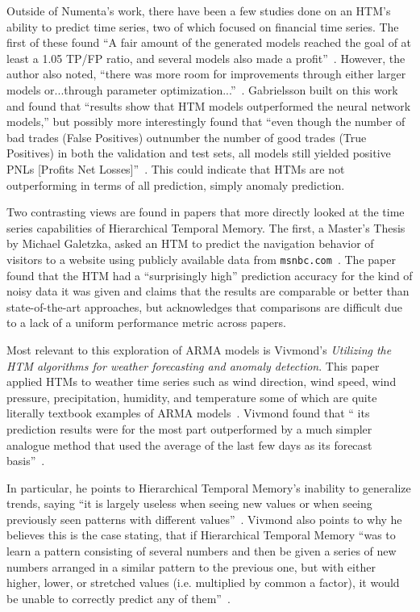 \documentclass[oneside,12pt,openany]{book}
\begin{document}
	Outside of Numenta's work, there have been a few studies done on an HTM's ability to predict time series, two of which focused on financial time series. The first of these found ``A fair amount of the generated models reached the goal of at least a 1.05 TP/FP ratio, and several models also made a profit''~\cite{Evaluation}. However, the author also noted, ``there was more room for improvements through either larger models or...through parameter optimization...''~\cite{Evaluation}. Gabrielsson built on this work and found that ``results show that HTM models outperformed the neural network models,'' but possibly more interestingly found that ``even though the number of bad trades (False Positives) outnumber the number of good trades (True Positives) in both the validation and test sets, all models still yielded positive PNLs [Profits Net Losses]''~\cite{EvolvingTrading}. This could indicate that HTMs are not outperforming in terms of all prediction, simply anomaly prediction.
	
	Two contrasting views are found in papers that more directly looked at the time series capabilities of Hierarchical Temporal Memory. The first, a Master's Thesis by Michael Galetzka, asked an HTM to predict the navigation behavior of visitors to a website using publicly available data from \texttt{msnbc.com}~\cite{Galetzka}. The paper found that the HTM had a ``surprisingly high'' prediction accuracy for the kind of noisy data it was given and claims that the results are comparable or better than state-of-the-art approaches, but acknowledges that comparisons are difficult due to a lack of a uniform performance metric across papers.
	
	Most relevant to this exploration of ARMA models is Vivmond's \textit{Utilizing the HTM algorithms for weather forecasting and anomaly detection}. This paper applied HTMs to weather time series such as wind direction, wind speed, wind pressure, precipitation, humidity, and temperature some of which are quite literally textbook examples of ARMA models~\cite{Box,WeatherForecast}. Vivmond found that `` its prediction results were for the most part outperformed by a much simpler analogue method that used the average of the last few days as its forecast basis''~\cite{WeatherForecast}. 
	
	In particular, he points to Hierarchical Temporal Memory's inability to generalize trends, saying ``it is largely useless when seeing new values or when seeing previously seen patterns with different values''~\cite{WeatherForecast}. Vivmond also points to why he believes this is the case stating, that if Hierarchical Temporal Memory ``was to learn a pattern consisting of several numbers and then be given a series of new numbers arranged in a similar pattern to the previous one, but with either higher, lower, or stretched values (i.e. multiplied by common a factor), it would be unable to correctly predict any of them''~\cite{WeatherForecast}. 
	
\end{document}

